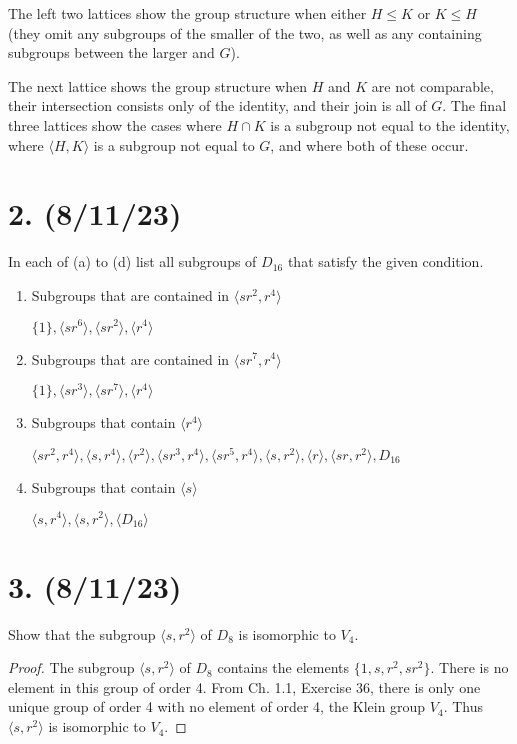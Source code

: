 \documentclass{article}
\begin{document}
\vspace{0.5cm}

The left two lattices show the group structure when either $H \leq K$ or $K \leq H$ (they omit any subgroups of the smaller of the two, as well as any containing subgroups between the larger and $G$).

The next lattice shows the group structure when $H$ and $K$ are not comparable, their intersection consists only of the identity, and their join is all of $G$. The final three lattices show the cases where $H \cap K$ is a subgroup not equal to the identity, where $\langle H, K \rangle$ is a subgroup not equal to $G$, and where both of these occur.

\section*{2. (8/11/23)}

In each of (a) to (d) list all subgroups of $D_{16}$ that satisfy the given condition.

\begin{enumerate}[label=(\alph*), itemsep=0em]
    \item Subgroups that are contained in $\langle sr^2, r^4 \rangle$

          $\{ 1 \}, \langle sr^6 \rangle, \langle sr^2 \rangle, \langle r^4 \rangle$
    \item Subgroups that are contained in $\langle sr^7, r^4 \rangle$

        $\{ 1 \}, \langle sr^3 \rangle, \langle sr^7 \rangle, \langle r^4 \rangle$
    \item Subgroups that contain $\langle r^4 \rangle$

        $\langle sr^2, r^4 \rangle, \langle s, r^4 \rangle, \langle r^2 \rangle, \langle sr^3, r^4 \rangle, \langle sr^5, r^4 \rangle, \langle s, r^2 \rangle, \langle r \rangle, \langle sr, r^2 \rangle, D_{16}$
    \item Subgroups that contain $\langle s \rangle$

        $\langle s, r^4 \rangle, \langle s, r^2 \rangle, \langle D_{16} \rangle$
\end{enumerate}

\section*{3. (8/11/23)}

Show that the subgroup $\langle s, r^2 \rangle$ of $D_8$ is isomorphic to $V_4$.

\begin{proof}
    The subgroup $\langle s, r^2 \rangle$ of $D_8$ contains the elements $\{ 1, s, r^2, sr^2 \}$. There is no element in this group of order 4. From Ch. 1.1, Exercise 36, there is only one unique group of order 4 with no element of order 4, the Klein group $V_4$. Thus $\langle s, r^2 \rangle$ is isomorphic to $V_4$.
\end{proof}
\end{document}
